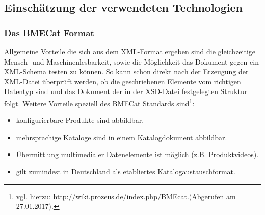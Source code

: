 				
		

		

	\clearpage
	\subsection{Einschätzung der verwendeten Technologien}

	
	\subsubsection{Das BMECat Format}
	
	Allgemeine Vorteile die sich aus dem XML-Format ergeben sind die gleichzeitige Mensch- und Maschinenlesbarkeit, sowie die Möglichkeit das Dokument gegen ein XML-Schema testen zu können. So kann schon direkt nach der Erzeugung der XML-Datei überprüft werden, ob die geschriebenen Elemente vom richtigen Datentyp sind und das Dokument der in der XSD-Datei festgelegten Struktur folgt. Weitere Vorteile speziell des BMECat Standards sind\footnote{vgl. hierzu: \url{http://wiki.prozeus.de/index.php/BMEcat}.(Abgerufen am 27.01.2017).}:
	
	\begin{itemize}[noitemsep]
	\item konfigurierbare Produkte sind abbildbar.
	\item mehrsprachige Kataloge sind in einem Katalogdokument abbildbar.
	\item Übermittlung multimedialer Datenelemente ist möglich (z.B. Produktvideos).
	\item gilt zumindest in Deutschland als etabliertes Katalogaustauschformat.
	\end{itemize}
	
